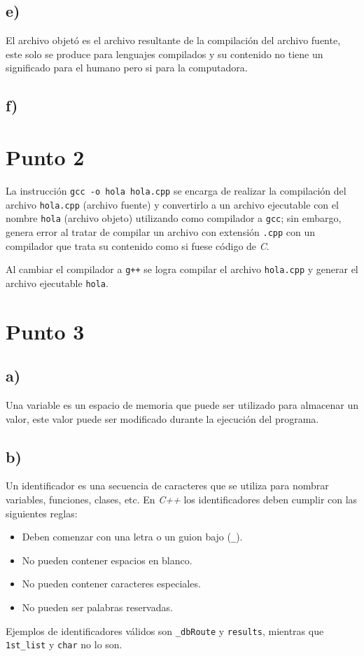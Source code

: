 \documentclass[10pt]{article}
\begin{document}
        \subsection*{e)}
        El archivo objetó es el archivo resultante de la compilación del archivo fuente, este solo se produce para lenguajes compilados y su contenido no tiene un significado para el humano pero si para la computadora.

        \subsection*{f)}
        

    \section*{Punto 2}
        La instrucción \texttt{gcc -o hola hola.cpp} se encarga de realizar la compilación del archivo \texttt{hola.cpp} (archivo fuente) y convertirlo a un archivo ejecutable con el nombre \texttt{hola} (archivo objeto) utilizando como compilador a \texttt{gcc}; sin embargo, genera error al tratar de compilar un archivo con extensión \texttt{.cpp} con un compilador que trata su contenido como si fuese código de \textit{C}.
        
        Al cambiar el compilador a \texttt{g++} se logra compilar el archivo \texttt{hola.cpp} y generar el archivo ejecutable \texttt{hola}.

    \section*{Punto 3}
        \subsection*{a)}
            Una variable es un espacio de memoria que puede ser utilizado para almacenar un valor, este valor puede ser modificado durante la ejecución del programa.

        \subsection*{b)}
            Un identificador es una secuencia de caracteres que se utiliza para nombrar variables, funciones, clases, etc. En \textit{C++} los identificadores deben cumplir con las siguientes reglas:
            \begin{itemize}
                \item Deben comenzar con una letra o un guion bajo (\texttt{\_}).
                \item No pueden contener espacios en blanco.
                \item No pueden contener caracteres especiales.
                \item No pueden ser palabras reservadas.
            \end{itemize}
            Ejemplos de identificadores válidos son \texttt{\_dbRoute} y \texttt{results}, mientras que \texttt{1st\_list} y \texttt{char} no lo son.
\end{document}

